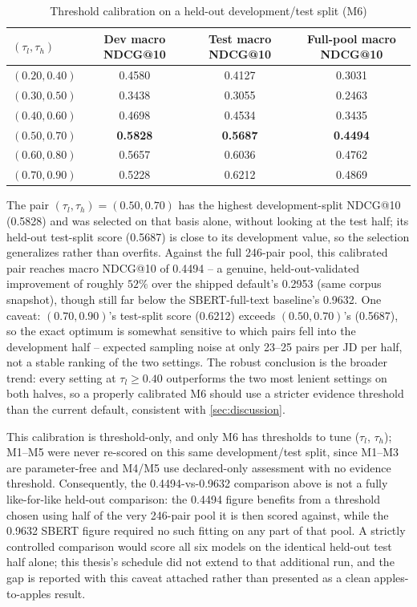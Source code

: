 \documentclass[12pt,a4paper,oneside]{report}
\begin{document}
\begin{table}[htbp]
\centering
\caption{Threshold calibration on a held-out development/test split (M6)}
\label{tab:threshold-calibration}
\begin{tabular}{lccc}
\toprule
$(\tau_l,\tau_h)$ & Dev macro NDCG@10 & Test macro NDCG@10 & Full-pool macro NDCG@10 \\
\midrule
$(0.20, 0.40)$ & 0.4580 & 0.4127 & 0.3031 \\
$(0.30, 0.50)$ & 0.3438 & 0.3055 & 0.2463 \\
$(0.40, 0.60)$ & 0.4698 & 0.4534 & 0.3435 \\
\textbf{$(0.50, 0.70)$} & \textbf{0.5828} & \textbf{0.5687} & \textbf{0.4494} \\
$(0.60, 0.80)$ & 0.5657 & 0.6036 & 0.4762 \\
$(0.70, 0.90)$ & 0.5228 & 0.6212 & 0.4869 \\
\bottomrule
\end{tabular}
\end{table}

The pair $(\tau_l,\tau_h)=(0.50,0.70)$ has the highest development-split NDCG@10 (0.5828) and was selected on that basis alone, without looking at the test half; its held-out test-split score (0.5687) is close to its development value, so the selection generalizes rather than overfits. Against the full 246-pair pool, this calibrated pair reaches macro NDCG@10 of 0.4494 -- a genuine, held-out-validated improvement of roughly $52\%$ over the shipped default's 0.2953 (same corpus snapshot), though still far below the SBERT-full-text baseline's 0.9632. One caveat: $(0.70,0.90)$'s test-split score (0.6212) exceeds $(0.50,0.70)$'s (0.5687), so the exact optimum is somewhat sensitive to which pairs fell into the development half -- expected sampling noise at only 23--25 pairs per JD per half, not a stable ranking of the two settings. The robust conclusion is the broader trend: every setting at $\tau_l \geq 0.40$ outperforms the two most lenient settings on both halves, so a properly calibrated M6 should use a stricter evidence threshold than the current default, consistent with \cref{sec:discussion}.

This calibration is threshold-only, and only M6 has thresholds to tune ($\tau_l$, $\tau_h$); M1--M5 were never re-scored on this same development/test split, since M1--M3 are parameter-free and M4/M5 use declared-only assessment with no evidence threshold. Consequently, the 0.4494-vs-0.9632 comparison above is not a fully like-for-like held-out comparison: the 0.4494 figure benefits from a threshold chosen using half of the very 246-pair pool it is then scored against, while the 0.9632 SBERT figure required no such fitting on any part of that pool. A strictly controlled comparison would score all six models on the identical held-out test half alone; this thesis's schedule did not extend to that additional run, and the gap is reported with this caveat attached rather than presented as a clean apples-to-apples result.
\end{document}
